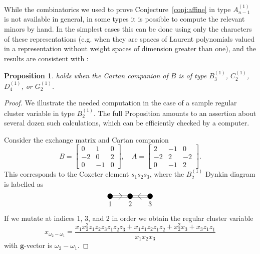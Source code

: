\documentclass[12pt]{amsart}
\newcommand{\bfg}{\mathbf{g}}
\newcommand{\ol}[1]{\overline{#1}}
\newtheorem{proposition}[theorem]{Proposition}
\theoremstyle{remark}
\numberwithin{equation}{section}
\numberwithin{figure}{section}
\begin{document}
While the combinatorics we used to prove Conjecture~\ref{conj:affine} in type $A_{n-1}^{\!(1)}$ is not available in general, in some types it is possible to compute the relevant minors by hand.
In the simplest cases this can be done using only the characters of these representations (e.g. when they are spaces of Laurent polynomials valued in a representation without weight spaces of dimension greater than one), and the results are consistent with :

\begin{proposition}
   holds when the Cartan companion of $B$ is of type $B_3^{(1)}$, $C_2^{(1)}$, $D_4^{(1)}$, or $G_2^{(1)}$.
\end{proposition}
\begin{proof}
  We illustrate the needed computation in the case of a sample regular cluster variable in type $B_{2}^{(1)}$.
  The full Proposition amounts to an assertion about several dozen such calculations, which can be efficiently checked by a computer.

  Consider the exchange matrix and Cartan companion
  \[
    B = 
    \begin{bmatrix} 
      0 & 1 & 0 \\ 
      -2 & 0 & 2 \\ 
      0 & -1 & 0  
    \end{bmatrix}, 
    \quad 
    A = 
    \begin{bmatrix} 
      2 & -1 & 0 \\ 
      -2 & 2 & -2 \\ 
      0 & -1 & 2  
    \end{bmatrix}.
  \]
  This corresponds to the Coxeter element $s_1 s_2 s_3$, where the $B_2^{(1)}$ Dynkin diagram is labelled as
  \vspace{3mm}
  \[
    \begin{tikzpicture}[scale=0.5]
      \draw (0, 0.1 cm) -- +(2 cm,0);
      \draw (0, -0.1 cm) -- +(2 cm,0);
      \draw[shift={(1.2, 0)}, rotate=0] (135 : 0.45cm) -- (0,0) -- (-135 : 0.45cm);
      {
        \pgftransformxshift{2 cm}
        \draw (0 cm,0) -- (0 cm,0);
        \draw (0 cm, 0.1 cm) -- +(2 cm,0);
        \draw (0 cm, -0.1 cm) -- +(2 cm,0);
        \draw[shift={(0.8, 0)}, rotate=180] (135 : 0.45cm) -- (0,0) -- (-135 : 0.45cm);
        \draw[fill=black] (0 cm, 0 cm) circle (.25cm) node[below=4pt]{$2$};
        \draw[fill=black] (2 cm, 0 cm) circle (.25cm) node[below=4pt]{$3$};
      }
      \draw[fill=black] (0 cm, 0 cm) circle (.25cm) node[below=4pt]{$1$};
    \end{tikzpicture}
  \]
  If we mutate at indices 1, 3, and 2 in order we obtain the regular cluster variable
  \[
    x_{\omega_2 - \omega_1} = \frac{x_1 x_2^2 z_1 z_2 z_3 z_{\ol{1}} z_{\ol{2}} z_{\ol{3}} + x_1 z_1 z_2 z_{\ol{1}} z_{\ol{2}} + x_2^2 x_3 +  x_3 z_1 z_{\ol{1}}}{x_1 x_2 x_3}
  \]
  with $\bfg$-vector is $\omega_2 - \omega_1$.


\end{proof}
\end{document}
